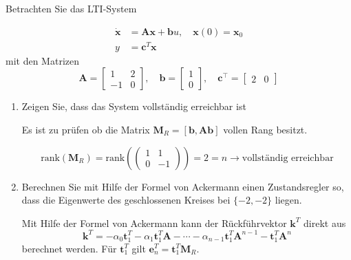 \documentclass{article}
\begin{document}
\begin{task}
Betrachten Sie das LTI-System

$$ 
\begin{aligned} \dot{\mathbf{x}} &=\mathbf{A x}+\mathbf{b} u, \quad \mathbf{x}(0)=\mathbf{x}_{0} \\ y &=\mathbf{c}^{T} \mathbf{x} \end{aligned}
 $$
mit den Matrizen
 $$ 
\mathbf{A}=\left[\begin{array}{cc}{1} & {2} \\ {-1} & {0}\end{array}\right], \quad \mathbf{b}=\left[\begin{array}{l}{1} \\ {0}\end{array}\right], \quad \mathbf{c}^{\top}=\left[\begin{array}{ll}{2} & {0}\end{array}\right]
 $$
 \begin{enumerate}[i]
  \item Zeigen Sie, dass das System vollständig erreichbar ist
\begin{solution}
Es ist zu prüfen ob die Matrix $\mathbf{M}_R = \left[\mathbf{b}, \mathbf{Ab} \right]$ vollen Rang besitzt.

\[ \text{rank}\left(\mathbf{M}_R\right) = \text{rank}\left(\begin{pmatrix} 1 & 1 \\ 0 & -1 \end{pmatrix}\right)=2=n \rightarrow \text{vollständig erreichbar}\]
\end{solution}
  \item Berechnen Sie mit Hilfe der Formel von Ackermann einen Zustandsregler so, dass
die Eigenwerte des geschlossenen Kreises bei $\{-2,-2\}$ liegen.
\begin{solution}
Mit Hilfe der Formel von Ackermann kann der Rückführvektor $\mathbf{k}^{T}$ direkt aus
\[ 
\mathbf{k}^{T}=-\alpha_{0} \mathbf{t}_{1}^{T}-\alpha_{1} \mathbf{t}_{1}^{T} \mathbf{A}-\cdots-\alpha_{n-1} \mathbf{t}_{1}^{T} \mathbf{A}^{n-1}-\mathbf{t}_{1}^{T} \mathbf{A}^{n}
 \]
 berechnet werden. Für $\mathbf{t}_{1}^{T}$ gilt $\mathbf{e}_{n}^{T}=\mathbf{t}_{1}^{T} \mathbf{M}_{R}$.
 

\end{solution}
\end{enumerate}
\end{task}
\end{document}
